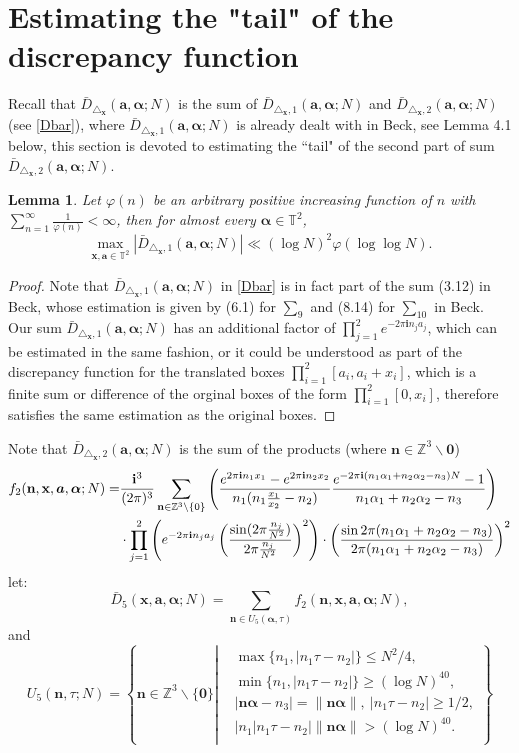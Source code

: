 \documentclass[11pt]{article}
\newtheorem{lem}[thm]{Lemma}
\newcommand{\beq}{\begin{equation}}
\newcommand{\eeq}{\end{equation}}
\newcommand{\fc}{\frac}
\renewcommand{\l}{\left}
\renewcommand{\r}{\right}
\newcommand{\Z}{\mathbb{Z}}
\newcommand{\T}{\mathbb{T}}
\renewcommand{\a}{\alpha}
\renewcommand{\i}{\mathbf{i}}
\renewcommand{\(}{\left(}
\renewcommand{\)}{\right)}
\renewcommand{\bf}{\mathbf}
\newcommand{\bal}{\begin{aligned}}
\newcommand{\eal}{\end{aligned}}
\newcommand{\Dbar}{\bar{D}_{\triangle_{\bf{x}}} (\bm{a},\bm{\a}; N)}
\newcommand{\n}{\bf{n}}
\newcommand{\bma}{\bm{\alpha}}
\newcommand{\Dbarone}{\bar{D}_{\triangle_{\bf{x}},1} (\bm{a},\bm{\a};N)}
\newcommand{\Dbartwo}{\bar{D}_{\triangle_{\bf{x}},2} (\bm{a},\bm{\a};N)}
\newcommand{\ftwo}{f_2(\bf{n},\bf{x},\bm{a},\bm{\a};N)}
\newcommand{\<}{\langle}
\renewcommand{\>}{\rangle}
\begin{document}
\section{Estimating the "tail" of the discrepancy function}
Recall that $\Dbar$ is the sum of $\Dbarone$ and $\Dbartwo$(see \eqref{Dbar}), where $\Dbarone$ is already dealt with in Beck\cite{Beck}, see Lemma 4.1 below, this section is devoted to estimating the ``tail" of the second part of sum $\Dbartwo$.
\begin{lem}
Let $\varphi(n)$ be an arbitrary positive increasing function of $n$ with $\sum_{n=1}^{\infty}\fc{1}{\varphi(n)}<\infty$, then for almost every $\bma\in \T^2$,
\beq\label{estimation for Dbarone}
\max_{\bf{x},\bm{a} \in \T^2}|\Dbarone| \ll (\log N)^2\varphi(\log\log N).
\eeq
\end{lem}
\begin{proof}
Note that $\Dbarone$ in \eqref{Dbar} is in fact part of the sum (3.12) in Beck\cite{Beck}, whose estimation is given by (6.1) for $\sum_9$ and (8.14) for $\sum_{10}$ in Beck\cite{Beck}. Our sum $\Dbarone$ has an additional factor of $\prod_{j=1}^{2}e^{-2\pi \i n_j a_j}$, which can be estimated in the same fashion, or it could be understood as part of the discrepancy function for the translated boxes $\prod_{i=1}^{2} [a_i,a_i+x_i]$, which is a finite sum or difference of the orginal boxes of the form $\prod_{i=1}^{2} [0,x_i]$, therefore satisfies the same estimation as the original boxes.
\end{proof}
Note that $\Dbartwo$ is the sum of the products (where $\bf{n}\in \Z^3 \backslash {\bf{0}}$)
\beq{\label{term}}
\begin{aligned}\ftwo=
&\fc{\i^3}{(2\pi)^3} \sum_{\bf{n}\in \Z^3\backslash\{0\}} 
\(\fc{e^{2\pi\i n_1x_1}-e^{2\pi\i n_2 x_2}}{n_1(n_1\fc{x_1}{x_2}-n_2)}\fc{e^{-2\pi \i (n_1\a_1+n_2\a_2-n_3)N}-1}{n_1\a_1+n_2\a_2-n_3}\)\\
&\cdot \prod_{j=1}^2 \(e^{-2\pi \i n_ja_j} \(\fc{\sin(2\pi \fc{n_j}{N^2})}{2\pi\fc{n_j}{N^2}}\)^2\)
\cdot \(\fc{\sin 2\pi(n_1\a_1+n_2\a_2-n_3)}{2\pi (n_1\a_1+n_2\a_2-n_3)}\)^2\\
\end{aligned}
\eeq
let:
$$
\bar{D}_5(\bf{x},\bm{a},\bm{\a};N)=\sum_{\bf{n}\in U_5(\bm{\a},\tau)}    \ftwo,
$$
and 
\beq
U_5(\n,\tau;N)=\l\{\n \in \Z^3\backslash \{\bf{0}\} \l| 
\bal &\max\{n_1,|n_1\tau-n_2|\} \le N^2/4, \\
&\min\{n_1,|n_1\tau-n_2|\}\ge(\log N)^{40}, \\
& |\n\bma-n_3|=\|\n\bma \|,\ |n_1\tau-n_2|\ge 1/2,\\
& |n_1|n_1\tau-n_2|\|\bf{n}\bma\|>(\log N)^{40}. \\
\eal\r.
\r\}
\eeq
\end{document}
